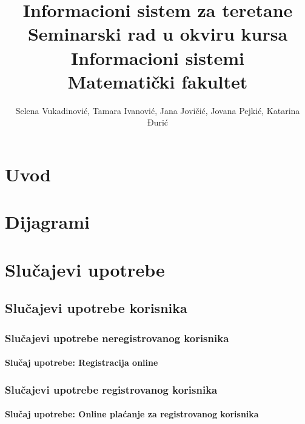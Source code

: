 \documentclass[a4paper]{article}
\begin{document}
\title{Informacioni sistem za teretane\\ \small{Seminarski rad u okviru kursa\\Informacioni sistemi\\ Matematički fakultet}}

\author{Selena Vukadinović, Tamara Ivanović, Jana Jovičić, Jovana Pejkić, Katarina Đurić}


\maketitle
\newpage

\tableofcontents
\newpage

\section{Uvod}
\label{sec:uvod}


\section{Dijagrami}



\section{Slučajevi upotrebe}

\subsection{Slučajevi upotrebe korisnika}
\subsubsection{Slučajevi upotrebe neregistrovanog korisnika}
\paragraph{Slučaj upotrebe: Registracija online}


\subsubsection{Slučajevi upotrebe registrovanog korisnika}
\paragraph{Slučaj upotrebe: Online plaćanje za registrovanog korisnika}

\end{document}
